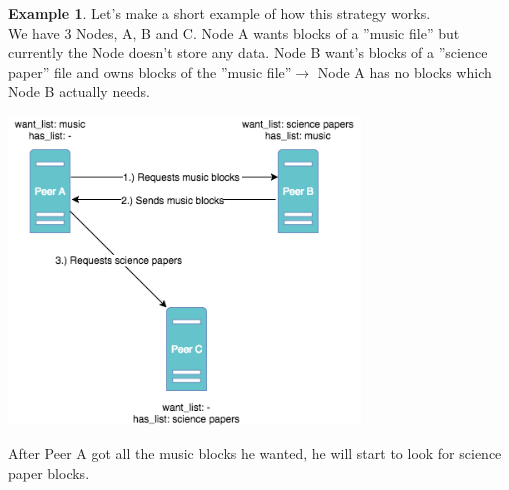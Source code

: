\documentclass[a4paper,11pt, oneside]{report}
\theoremstyle{definition}
\newtheorem{exmp}{Example}[subsection]
\begin{document}
\newpage
\begin{exmp}
Let's make a short example of how this strategy works.\\ 
We have 3 Nodes, A, B and C. Node A wants blocks of a ''music file'' but currently the Node doesn't store any data. Node B want's blocks of a ''science paper'' file and owns blocks of the ''music file''$\rightarrow$ Node A has no blocks which Node B actually needs.
\begin{center}
\includegraphics[width=0.7\textwidth]{img/ipfs_bitswap_noblocks.png}\\[0.3cm] 
\end{center}
After Peer A got all the music blocks he wanted, he will start to look for science paper blocks.
\end{exmp}
\newpage
\end{document}

